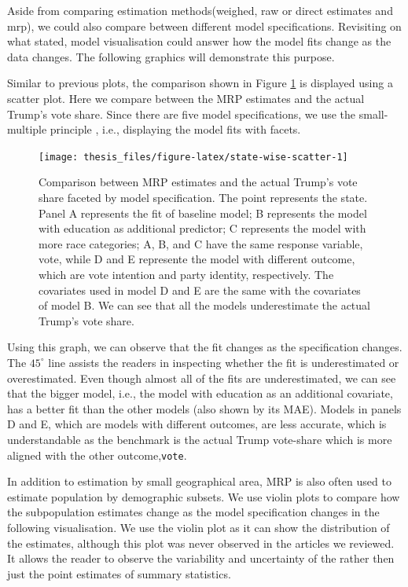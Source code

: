 \documentclass{monashthesis}
\begin{document}
Aside from comparing estimation methods(weighed, raw or direct estimates and mrp), we could also compare between different model specifications. Revisiting on what \textcite{WickhamHadley2015VsmR} stated, model visualisation could answer how the model fits change as the data changes. The following graphics will demonstrate this purpose.

Similar to previous plots, the comparison shown in Figure \ref{fig:state-wise-scatter} is displayed using a scatter plot. Here we compare between the MRP estimates and the actual Trump's vote share. Since there are five model specifications, we use the small-multiple principle \autocite{MIDWAY2020100141}, i.e., displaying the model fits with facets.

\begin{figure}

\texttt{[image: thesis\_files/figure-latex/state-wise-scatter-1]} \hfill{}

\caption{Comparison between MRP estimates and the actual Trump's vote share faceted by model specification. The point represents the state. Panel A represents the fit of baseline model; B represents the model with education as additional predictor; C represents the model with more race categories; A, B, and C have the same response variable, vote, while D and E represente the model with different outcome, which are vote intention and party identity, respectively. The covariates used in model D and E are the same with the covariates of model B. We can see that all the models underestimate the actual Trump's vote share.}\label{fig:state-wise-scatter}
\end{figure}

Using this graph, we can observe that the fit changes as the specification changes. The \(45^{\circ}\) line assists the readers in inspecting whether the fit is underestimated or overestimated. Even though almost all of the fits are underestimated, we can see that the bigger model, i.e., the model with education as an additional covariate, has a better fit than the other models (also shown by its MAE). Models in panels D and E, which are models with different outcomes, are less accurate, which is understandable as the benchmark is the actual Trump vote-share which is more aligned with the other outcome,\texttt{vote}.

In addition to estimation by small geographical area, MRP is also often used to estimate population by demographic subsets. We use violin plots to compare how the subpopulation estimates change as the model specification changes in the following visualisation. We use the violin plot as it can show the distribution of the estimates, although this plot was never observed in the articles we reviewed. It allows the reader to observe the variability and uncertainty of the rather then just the point estimates of summary statistics.
\end{document}
